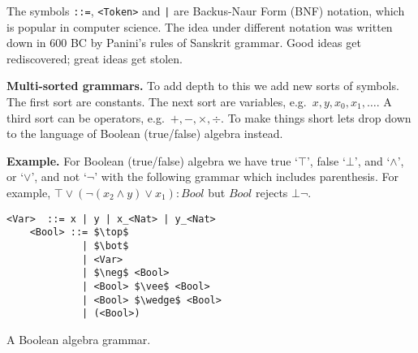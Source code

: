 \begin{remark}
The symbols \lstinline{::=}, \lstinline{<Token>} and \lstinline{|} are 
Backus-Naur Form (BNF) notation, which is popular 
in computer science.  The idea under different notation was written 
down in 600 BC by Panini's rules of Sanskrit grammar.  Good ideas get rediscovered;
great ideas get stolen.
\end{remark}


\noindent\textbf{Multi-sorted grammars.} To add depth to this we add new sorts
of symbols.  The first sort are constants.  The next sort are variables, e.g.\
$x,y,x_0,x_1,\ldots$. A third sort can be operators, e.g.\ $+,-,\times,\div$.
To make things short lets drop down to the language of Boolean (true/false) algebra
instead.
\medskip

\noindent\textbf{Example.}
For Boolean (true/false) algebra we have true `$\top$', false `$\bot$', 
and `$\wedge$', or `$\vee$', and not `$\neg$' with the following grammar
which includes parenthesis. For example, $\top \vee (\neg(x_2\wedge y)\vee x_1):Bool$ but $Bool$ rejects $\bot\neg$.
\begin{lstfloat}[!hbtp]
\begin{lstlisting}[mathescape]
    <Var>  ::= x | y | x_<Nat> | y_<Nat>
    <Bool> ::= $\top$ 
             | $\bot$ 
             | <Var>
             | $\neg$ <Bool> 
             | <Bool> $\vee$ <Bool> 
             | <Bool> $\wedge$ <Bool>
             | (<Bool>)
\end{lstlisting}
\caption{A Boolean algebra grammar.}
\end{lstfloat}

